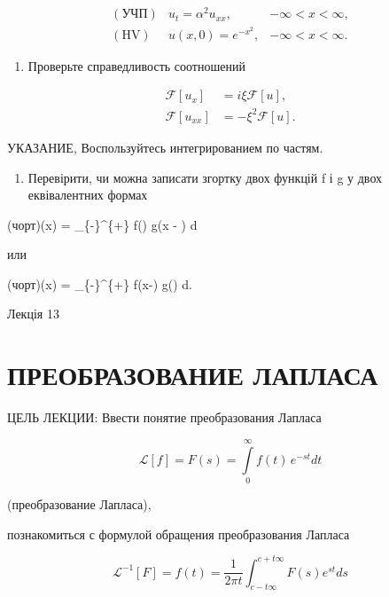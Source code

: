 \documentclass[
  ukrainian,
]{article}
\providecommand{\tightlist}{%
  \setlength{\itemsep}{0pt}\setlength{\parskip}{0pt}}
\begin{document}
\[
\begin{aligned} (\text{УЧП}) & u_t = \alpha^2 u_{xx}, & -\infty < x < \infty, \\ (\text{HV}) & u(x, 0) = e^{-x^2}, & -\infty < x < \infty. \end{aligned}
\]

\begin{enumerate}
\def\labelenumi{\arabic{enumi}.}
\setcounter{enumi}{3}
\tightlist
\item
  Проверьте справедливость соотношений
\end{enumerate}

\[
\begin{aligned} \mathcal{F}\left[u_{x}\right] &= i\xi \mathcal{F}\left[u\right], \\ \mathcal{F}\left[u_{xx}\right] &= -\xi^{2} \mathcal{F}\left[u\right]. \end{aligned}
\]

УКАЗАНИЕ, Воспользуйтесь интегрированием по частям.

\begin{enumerate}
\def\labelenumi{\arabic{enumi}.}
\setcounter{enumi}{4}
\tightlist
\item
  Перевірити, чи можна записати згортку двох функцій f і g у двох
  еквівалентних формах
\end{enumerate}

(чорт)(x) =  \int\_\{-\infty\}\^{}\{+\infty\}
f(\xi) g(x - \xi) d\xi

или

(чорт)(x) =  \int\_\{-\infty\}\^{}\{+\infty\}
f(x-\xi) g(\xi) d\xi.

Лекція 13

\section{ПРЕОБРАЗОВАНИЕ
ЛАПЛАСА}\label{ux43fux440ux435ux43eux431ux440ux430ux437ux43eux432ux430ux43dux438ux435-ux43bux430ux43fux43bux430ux441ux430}

ЦЕЛЬ ЛЕКЦИИ: Ввести понятие преобразования Лапласа

\[
\mathscr{L}[f] = F(s) = \int\limits_0^\infty f(t)\,e^{-st}dt
\]

(преобразование Лапласа),

познакомиться с формулой обращения преобразования Лапласа

\[
\mathscr{L}^{-1}[F] = f(t) = \frac{1}{2\pi t} \int_{c-t\infty}^{c+t\infty} F(s) e^{st} ds
\]
\end{document}
